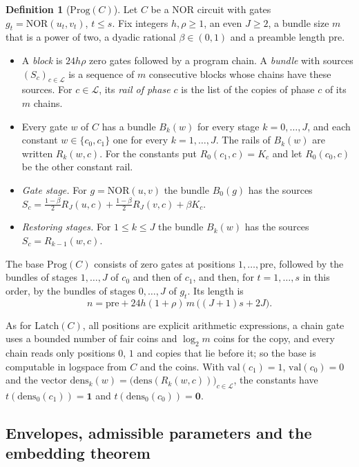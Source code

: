 \documentclass[11pt]{amsart}
\theoremstyle{definition}
\newtheorem{definition}[theorem]{Definition}
\theoremstyle{remark}
\newcommand{\NOR}{\mathrm{NOR}}
\newcommand{\val}{\mathrm{val}}
\begin{document}
\begin{definition}[$\mathrm{Prog}(C)$]\label{def:prog}
Let $C$ be a NOR circuit with gates $g_t=\NOR(u_t,v_t)$, $t\le s$. Fix integers $h,\rho\ge1$, an
even $J\ge2$, a bundle size $m$ that is a power of two, a dyadic rational $\beta\in(0,1)$ and a
preamble length $\mathrm{pre}$.
\begin{itemize}[leftmargin=2em]
\item A \emph{block} is $24h\rho$ zero gates followed by a program chain. A \emph{bundle} with
sources $(S_c)_{c\in\mathcal L}$ is a sequence of $m$ consecutive blocks whose chains have these
sources. For $c\in\mathcal L$, its \emph{rail of phase $c$} is the list of the copies of phase $c$ of
its $m$ chains.
\item Every gate $w$ of $C$ has a bundle $B_k(w)$ for every stage $k=0,\dots,J$, and each constant
$w\in\{c_0,c_1\}$ one for every $k=1,\dots,J$. The rails of $B_k(w)$ are written $R_k(w,c)$. For
the constants put $R_0(c_1,c)=K_c$ and let $R_0(c_0,c)$ be the other constant rail.
\item \emph{Gate stage.} For $g=\NOR(u,v)$ the bundle $B_0(g)$ has the sources
$S_c=\frac{1-\beta}2R_J(u,c)+\frac{1-\beta}2R_J(v,c)+\beta K_c$.
\item \emph{Restoring stages.} For $1\le k\le J$ the bundle $B_k(w)$ has the sources
$S_c=R_{k-1}(w,c)$.
\end{itemize}
The base $\mathrm{Prog}(C)$ consists of zero gates at positions $1,\dots,\mathrm{pre}$, followed by
the bundles of stages $1,\dots,J$ of $c_0$ and then of $c_1$, and then, for $t=1,\dots,s$ in this
order, by the bundles of stages $0,\dots,J$ of $g_t$. Its length is
\[
n=\mathrm{pre}+24h(1+\rho)\,m\,\bigl((J+1)s+2J\bigr).
\]
\end{definition}

As for $\mathrm{Latch}(C)$, all positions are explicit arithmetic expressions, a chain gate uses
a bounded number of fair coins and $\log_2m$ coins for the copy, and every chain reads only
positions $0$, $1$ and copies that lie before it; so the base is computable in logspace from $C$
and the coins. With $\val(c_1)=1$, $\val(c_0)=0$ and the vector
$\mathrm{dens}_k(w)=\bigl(\mathrm{dens}(R_k(w,c))\bigr)_{c\in\mathcal L}$, the constants have
$t(\mathrm{dens}_0(c_1))=\mathbf 1$ and $t(\mathrm{dens}_0(c_0))=\mathbf 0$.

\subsection{Envelopes, admissible parameters and the embedding theorem}
\end{document}
